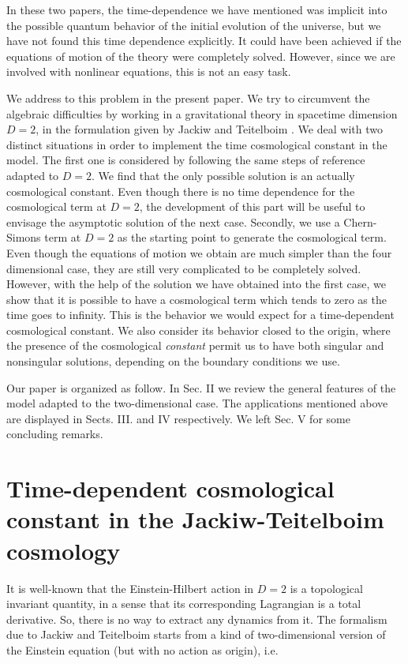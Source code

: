 \documentclass[a4paper,twocolumn,prd,groupedaddress,nofootinbib,showpacs]
{revtex4}
\begin{document}
\medskip
In these two papers, the time-dependence we have mentioned was
implicit into the possible quantum behavior of the initial evolution
of the universe, but we have not found this time dependence
explicitly. It could have been achieved if the equations of motion of
the theory were completely solved. However, since we are involved with
nonlinear equations, this is not an easy task.

\medskip
We address to this problem in the present paper. We try to circumvent
the algebraic difficulties by working in a gravitational theory in
spacetime dimension $D=2$, in the formulation given by Jackiw and
Teitelboim \cite{Jackiw}. We deal with two distinct situations in
order to implement the time cosmological constant in the model. The
first one is considered by following the same steps of reference
\cite{Novello2} adapted to $D=2$. We find that the only possible
solution is an actually cosmological constant. Even though there is no
time dependence for the cosmological term at $D=2$, the development of
this part will be useful to envisage the asymptotic solution of the
next case. Secondly, we use a Chern-Simons \cite{Deser} term at $D=2$
\cite{Barcelos} as the starting point to generate the cosmological
term. Even though the equations of motion we obtain are much simpler
than the four dimensional case, they are still very complicated to be
completely solved. However, with the help of the solution we have
obtained into the first case, we show that it is possible to have a
cosmological term which tends to zero as the time goes to infinity.
This is the behavior we would expect for a time-dependent cosmological
constant. We also consider its behavior closed to the origin, where
the presence of the cosmological {\it constant} permit us to have
both singular and nonsingular solutions, depending on the boundary
conditions we use.

\medskip
Our paper is organized as follow. In Sec. II we review the general
features of the model adapted to the two-dimensional case. The
applications mentioned above are displayed in Sects. III. and IV
respectively. We left Sec. V for some concluding remarks.

\section{Time-dependent cosmological constant in the Jackiw-Teitelboim
cosmology}
\renewcommand{\theequation}{2.\arabic{equation}}
\setcounter{equation}{0}

It is well-known that the Einstein-Hilbert action in $D=2$ is a
topological invariant quantity, in a sense that its corresponding
Lagrangian is a total derivative. So, there is no way to extract any
dynamics from it. The formalism due to Jackiw and Teitelboim
\cite{Jackiw} starts from a kind of two-dimensional version of the
Einstein equation (but with no action as origin), i.e.
\end{document}
